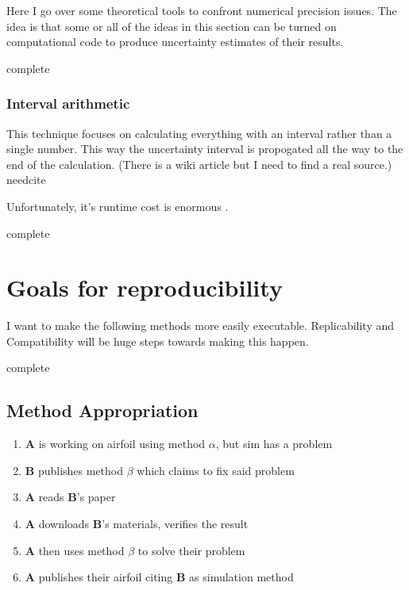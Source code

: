 \documentclass[american]{article}
\newcommand{\complete}{
	\gls{complete}
}
\newcommand{\needcite}{
	\gls{needcite}
}
\begin{document}
Here I go over some theoretical tools to confront numerical precision issues. The idea is that some or all of the ideas in this section can be turned on computational code to produce uncertainty estimates of their results.

\complete

\subsubsection{Interval arithmetic} \label{sec:precision-theory-interval}

This technique focuses on calculating everything with an interval rather than a single number. This way the uncertainty interval is propogated all the way to the end of the calculation. (There is a wiki article but I need to find a real source.) \needcite

Unfortunately, it's runtime cost is enormous \cite{dhb-numerical-bugs}.

\complete

\section{Goals for reproducibility} \label{sec:goals}

I want to make the following methods more easily executable. Replicability and Compatibility will be huge steps towards making this happen.

\complete

\subsection{Method Appropriation} \label{sec:goals-appropriation}

\begin{enumerate}
\item \textbf{A} is working on airfoil using method \boldmath$\alpha$, but sim has a problem
\item \textbf{B} publishes method $\beta$ which claims to fix said problem
\item \textbf{A} reads \textbf{B}'s paper
\item \textbf{A} downloads \textbf{B}'s materials, verifies the result
\item \textbf{A} then uses method $\beta$ to solve their problem
\item \textbf{A} publishes their airfoil citing \textbf{B} as simulation method
\end{enumerate}
\end{document}
